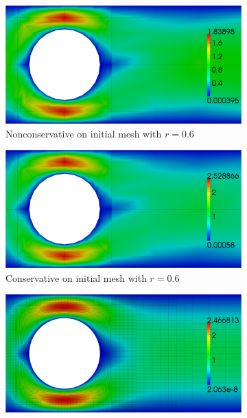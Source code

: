 \documentclass[letterpaper]{article}
\begin{document}
\begin{figure}[p]
\centering
\begin{subfigure}[t]{0.45\textwidth}
\centering
\includegraphics[width=\textwidth]{figs/StokesCylinder/umag6_NC0.png}
\caption{Nonconservative on initial mesh with $r=0.6$}
\label{fig:stokesCylinder6NC0}
\end{subfigure}
\begin{subfigure}[t]{0.45\textwidth}
\centering
\includegraphics[width=\textwidth]{figs/StokesCylinder/umag6_C0.png}
\caption{Conservative on initial mesh with $r=0.6$}
\label{fig:stokesCylinder6C0}
\end{subfigure}
\begin{subfigure}[t]{0.45\textwidth}
\centering
\includegraphics[width=\textwidth]{figs/StokesCylinder/umag6_NC6.png}

\end{subfigure}
\end{figure}
\end{document}
